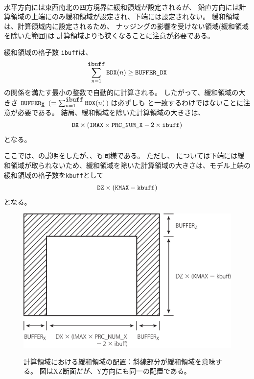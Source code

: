 \\


%
水平方向には東西南北の四方境界に緩和領域が設定されるが、
鉛直方向には計算領域の上端にのみ緩和領域が設定され、下端には設定されない。
緩和領域は、計算領域内に設定されるため、
ナッジングの影響を受けない領域(緩和領域を除いた範囲)は
計算領域よりも狭くなることに注意が必要である。

緩和領域の格子数 \verb|ibuff|は、
\[
\sum_{n=1}^{\verb|ibuff|} \verb|BDX|(n) \ge \nmitemeq{BUFFER_DX} \nonumber
\]
の関係を満たす最小の整数で自動的に計算される。
したがって、緩和領域の大きさ $\verb|BUFFER|_{\verb|X|}$ ($= \sum_{n=1}^{\verb|ibuff|} \verb|BDX|(n)$)
は必ずしも  と一致するわけではないことに注意が必要である。
結局、緩和領域を除いた計算領域の大きさは、
\[
\nmitemeq{DX} \times ( \nmitemeq{IMAX} \times \nmitemeq{PRC_NUM_X} - 2 \times \verb|ibuff| )
\]
となる。

ここでは、{\XDIR}の説明をしたが、{\YDIR}、{\ZDIR}も同様である。
ただし、{\ZDIR} については下端には緩和領域が取られないため、緩和領域を除いた計算領域の大きさは、モデル上端の緩和領域の格子数を\verb|kbuff|として
\[
\nmitemeq{DZ} \times ( \nmitemeq{KMAX} - \verb|kbuff| )
\]
となる。


\begin{figure}[t]
\begin{center}
  \includegraphics[width=0.8\hsize]{./figure/buffer_xz.eps}\\
  \caption{計算領域における緩和領域の配置：斜線部分が緩和領域を意味する。
  図はXZ断面だが、Y方向にも同一の配置である。}
  \label{fig:buff_xz}
\end{center}
\end{figure}


